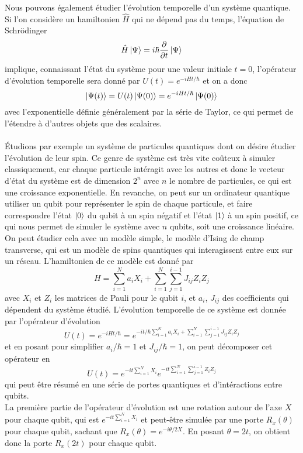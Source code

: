 Nous pouvons également étudier l'évolution temporelle d'un système quantique.
Si l'on considère un hamiltonien $\hat{H}$ qui ne dépend pas du temps, l'équation de Schrödinger
\[
    \hat{H} \ket{\Psi} = i \hbar \pdv{t} \ket{\Psi}
\]
implique, connaissant l'état du système pour une valeur initiale $t = 0$, l'opérateur d'évolution
temporelle sera donné par $U(t) = e^{-iHt/\hbar}$ et on a donc
\[
    \ket{\Psi(t)} = U(t) \ket{\Psi(0)} = e^{-iHt/\hbar} \ket{\Psi(0)}
\]
avec l'exponentielle définie généralement par la série de Taylor, ce qui permet de l'étendre à d'autres
objets que des scalaires.\\ \\
Étudions par exemple un système de particules quantiques dont on désire étudier l'évolution de leur
spin.
Ce genre de système est très vite coûteux à simuler classiquement, car chaque particule intéragit avec
les autres et donc le vecteur d'état du système est de dimension $2^n$ avec $n$ le nombre de particules,
ce qui est une croissance exponentielle.
En revanche, on peut sur un ordinateur quantique utiliser un qubit pour représenter le spin de chaque
particule, et faire correspondre l'état $\ket{0}$ du qubit à un spin négatif et l'état $\ket{1}$ à un
spin positif, ce qui nous permet de simuler le système avec $n$ qubits, soit une croissance linéaire.\\
On peut étudier cela avec un modèle simple, le modèle d'Ising de champ transverse, qui est un modèle
de spins quantiques qui interagissent entre eux sur un réseau.
L'hamiltonien de ce modèle est donné par
\[
    H = \sum_{i=1}^{N} a_i X_i + \sum_{i=1}^{N} \sum_{j=1}^{i-1}J_{ij}Z_i Z_j
\]
avec $X_i$ et $Z_i$ les matrices de Pauli pour le qubit $i$, et $a_i$, $J_{ij}$ des coefficients
qui dépendent du système étudié.
L'évolution temporelle de ce système est donnée par l'opérateur d'évolution
\[
    U(t) = e^{-iHt/\hbar} = e^{-it/\hbar \sum_{i=1}^{N} a_i X_i + \sum_{i=1}^{N} \sum_{j=1}^{i-1}J_{ij}Z_i Z_j}
\]
et en posant pour simplifier $a_i/\hbar = 1$ et $J_{ij}/\hbar = 1$, on peut décomposer cet opérateur en
\[
    U(t) = e^{-it \sum_{i=1}^{N} X_i} e^{-it \sum_{i=1}^{N} \sum_{j=1}^{i-1}Z_i Z_j}
\]
qui peut être résumé en une série de portes quantiques et d'intéractions entre qubits.\\
La première partie de l'opérateur d'évolution est une rotation autour de l'axe $X$ pour chaque qubit,
qui est $e^{-it \sum_{i=1}^{N} X_i}$ et peut-être simulée par une porte $R_x(\theta)$ pour chaque qubit,
sachant que $R_x(\theta) = e^{-i\theta/2 X}$.
En posant $\theta = 2t$, on obtient donc la porte $R_x(2t)$ pour chaque qubit.
